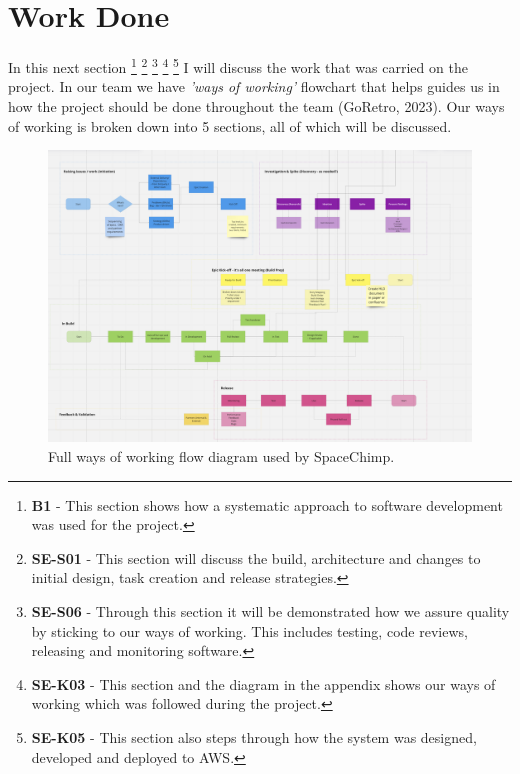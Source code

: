 \section{Work Done}
  In this next section 
  \footnote{\textbf{B1} - This section shows how a systematic approach to software development was used for the project.}
  \footnote{\textbf{SE-S01} - This section will discuss the build, architecture and changes to initial design, task creation and release strategies.}
  \footnote{\textbf{SE-S06} - Through this section it will be demonstrated how we assure quality by sticking to our ways of working. This includes testing, 
  code reviews, releasing and monitoring software.}
  \footnote{\textbf{SE-K03} - This section and the diagram in the appendix shows our ways of working which was followed during the project.}
  \footnote{\textbf{SE-K05} - This section also steps through how the system was designed, developed and deployed to AWS.}
  I will discuss the work that was carried on the project. In our team we have \textit{'ways of working'}
  flowchart that helps guides us in how the project should be done throughout the team (GoRetro, 2023). Our ways of working is broken down into 5 sections, 
  all of which will be discussed.

  \begin{figure}[H]
    \centering
    \includegraphics[width=12cm]{assets/workflow/fullWorkflow.png}
    \caption{Full ways of working flow diagram used by SpaceChimp.}
    \label{fig:fullWorkflow}
  \end{figure}

  \newpage

  
  
  
  
  

  \newpage
  
  